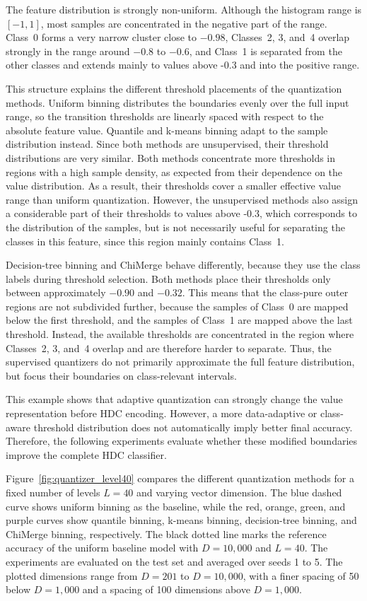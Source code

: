   The feature distribution is strongly non-uniform. Although the histogram range is $[-1,1]$, most samples are concentrated in the negative part of the range. Class~0 forms a very narrow cluster close to $-0.98$, Classes~2, 3, and~4 overlap strongly in the range around $-0.8$ to $-0.6$, and Class~1 is separated from the other classes and extends mainly to values above -0.3 and into the positive range.

This structure explains the different threshold placements of the quantization methods.
Uniform binning distributes the boundaries evenly over the full input range, so the transition thresholds are linearly spaced with respect to the absolute feature value.
Quantile and k-means binning adapt to the sample distribution instead. Since both methods are unsupervised, their threshold distributions are very similar. Both methods concentrate more thresholds in regions with a high sample density, as expected from their dependence on the value distribution. As a result, their thresholds cover a smaller effective value range than uniform quantization. However, the unsupervised methods also assign a considerable part of their thresholds to values above -0.3, which corresponds to the distribution of the samples, but is not necessarily useful for separating the classes in this feature, since this region mainly contains Class~1.

Decision-tree binning and ChiMerge behave differently, because they use the class labels during threshold selection. Both methods place their thresholds only between approximately $-0.90$ and $-0.32$. This means that the class-pure outer regions are not subdivided further, because the samples of Class~0 are mapped below the first threshold, and the samples of Class~1 are mapped above the last threshold. Instead, the available thresholds are concentrated in the region where Classes~2, 3, and~4 overlap and are therefore harder to separate. Thus, the supervised quantizers do not primarily approximate the full feature distribution, but focus their boundaries on class-relevant intervals.

This example shows that adaptive quantization can strongly change the value representation before HDC encoding. However, a more data-adaptive or class-aware threshold distribution does not automatically imply better final accuracy. Therefore, the following experiments evaluate whether these modified boundaries improve the complete HDC classifier.


Figure~\ref{fig:quantizer_level40} compares the different quantization methods for a fixed number of levels $L=40$ and varying vector dimension. The blue dashed curve shows uniform binning as the baseline, while the red, orange, green, and purple curves show quantile binning, k-means binning, decision-tree binning, and ChiMerge binning, respectively. The black dotted line marks the reference accuracy of the uniform baseline model with $D=10{,}000$ and $L=40$. The experiments are evaluated on the test set and averaged over seeds 1 to 5. The plotted dimensions range from $D=201$ to $D=10{,}000$, with a finer spacing of 50 below $D=1{,}000$ and a spacing of 100 dimensions above $D=1{,}000$.


